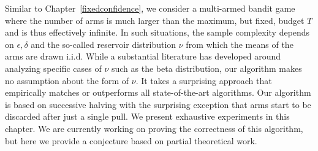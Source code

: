 Similar to Chapter~\ref{fixedconfidence}, we consider a multi-armed bandit game where the number of arms is much larger than the maximum, but fixed, budget $T$ and is thus effectively infinite.
In such situations, the sample complexity depends on $\epsilon, \delta$ and the so-called reservoir distribution $\nu$ from which the means of the arms are drawn i.i.d. 
While a substantial literature has developed around analyzing specific cases of $\nu$ such as the beta distribution, our algorithm makes no assumption about the form of $\nu$. It takes a surprising approach that empirically matches or outperforms all state-of-the-art algorithms. 
Our algorithm is based on successive halving with the surprising exception that arms start to be discarded after just a single pull. We present exhaustive experiments in this chapter. We are currently working on proving the correctness of this algorithm, but here we provide a conjecture based on partial theoretical work. 







\clearpage

\clearpage

%


